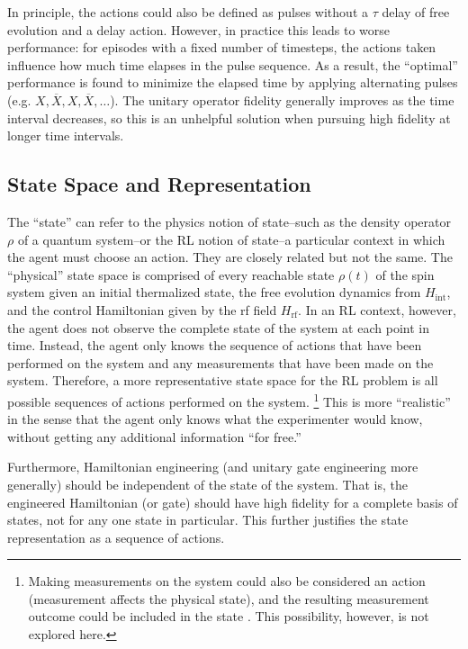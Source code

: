 In principle, the actions could also be defined as pulses without a $\tau$ delay of free evolution and a delay action. However, in practice this leads to worse performance: for episodes with a fixed number of timesteps, the actions taken influence how much time elapses in the pulse sequence. As a result, the ``optimal'' performance is found to minimize the elapsed time by applying alternating pulses (e.g. $X, \overline{X}, X, \overline{X}, \dots$).
The unitary operator fidelity generally improves as the time interval decreases, so this is an unhelpful solution when pursuing high fidelity at longer time intervals.

\subsection{State Space and Representation}

The ``state'' can refer to the physics notion of state--such as the density operator $\rho$ of a quantum system--or the RL notion of state--a particular context in which the agent must choose an action. They are closely related but not the same.
The ``physical'' state space is comprised of every reachable state $\rho(t)$ of the spin system given an initial thermalized state, the free evolution dynamics from $H_{\text{int}}$, and the control Hamiltonian given by the rf field $H_{\text{rf}}$.
In an RL context, however, the agent does not observe the complete state of the system at each point in time. Instead, the agent only knows the sequence of actions that have been performed on the system and any measurements that have been made on the system.
Therefore, a more representative state space for the RL problem is all possible sequences of actions performed on the system.%
\footnote{
Making measurements on the system could also be considered an action (measurement affects the physical state), and the resulting measurement outcome could be included in the state \cite{porotti2019coherent}. This possibility, however, is not explored here.
}
This is more ``realistic'' in the sense that the agent only knows what the experimenter would know, without getting any additional information ``for free.''

Furthermore, Hamiltonian engineering (and unitary gate engineering more generally) should be independent of the state of the system. That is, the engineered Hamiltonian (or gate) should have high fidelity for a complete basis of states, not for any one state in particular. This further justifies the state representation as a sequence of actions.

